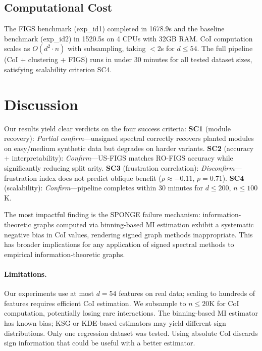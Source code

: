 \documentclass[11pt,letterpaper]{article}
\begin{document}
\subsection{Computational Cost}

The FIGS benchmark (exp\_id1) completed in 1678.9s and the baseline benchmark (exp\_id2) in 1520.5s on 4 CPUs with 32GB RAM.
CoI computation scales as $O(d^2 \cdot n)$ with subsampling, taking $<2$s for $d \leq 54$.
The full pipeline (CoI + clustering + FIGS) runs in under 30 minutes for all tested dataset sizes, satisfying scalability criterion SC4.

\section{Discussion}

Our results yield clear verdicts on the four success criteria:
\textbf{SC1} (module recovery): \emph{Partial confirm}---unsigned spectral correctly recovers planted modules on easy/medium synthetic data but degrades on harder variants.
\textbf{SC2} (accuracy + interpretability): \emph{Confirm}---US-FIGS matches RO-FIGS accuracy while significantly reducing split arity.
\textbf{SC3} (frustration correlation): \emph{Disconfirm}---frustration index does not predict oblique benefit ($\rho \approx -0.11$, $p = 0.71$).
\textbf{SC4} (scalability): \emph{Confirm}---pipeline completes within 30 minutes for $d \leq 200$, $n \leq 100$K.

The most impactful finding is the SPONGE failure mechanism: information-theoretic graphs computed via binning-based MI estimation exhibit a systematic negative bias in CoI values, rendering signed graph methods inappropriate.
This has broader implications for any application of signed spectral methods to empirical information-theoretic graphs.

\paragraph{Limitations.}
Our experiments use at most $d = 54$ features on real data; scaling to hundreds of features requires efficient CoI estimation.
We subsample to $n \leq 20$K for CoI computation, potentially losing rare interactions.
The binning-based MI estimator has known bias; KSG or KDE-based estimators may yield different sign distributions.
Only one regression dataset was tested.
Using absolute CoI discards sign information that could be useful with a better estimator.
\end{document}
